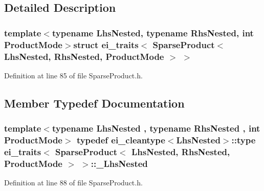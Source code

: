\subsection{Detailed Description}
\subsubsection*{template$<$typename Lhs\-Nested, typename Rhs\-Nested, int Product\-Mode$>$struct ei\-\_\-traits$<$ Sparse\-Product$<$ Lhs\-Nested, Rhs\-Nested, Product\-Mode $>$ $>$}



Definition at line 85 of file Sparse\-Product.\-h.



\subsection{Member Typedef Documentation}
\hypertarget{structei__traits_3_01_sparse_product_3_01_lhs_nested_00_01_rhs_nested_00_01_product_mode_01_4_01_4_af898ee594161d9fd735ea646f3f9b086}{
\subsubsection[{\-\_\-\-Lhs\-Nested}]{\setlength{\rightskip}{0pt plus 5cm}template$<$typename Lhs\-Nested , typename Rhs\-Nested , int Product\-Mode$>$ typedef {\bf ei\-\_\-cleantype}$<$Lhs\-Nested$>$\-::{\bf type} {\bf ei\-\_\-traits}$<$ {\bf Sparse\-Product}$<$ Lhs\-Nested, Rhs\-Nested, Product\-Mode $>$ $>$\-::{\bf \-\_\-\-Lhs\-Nested}}}\label{structei__traits_3_01_sparse_product_3_01_lhs_nested_00_01_rhs_nested_00_01_product_mode_01_4_01_4_af898ee594161d9fd735ea646f3f9b086}


Definition at line 88 of file Sparse\-Product.\-h.

